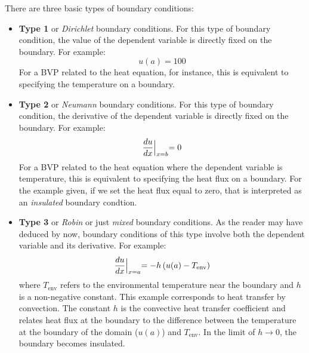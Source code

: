 There are three basic types of boundary conditions:
\begin{itemize}
\item \textbf{Type 1} or \emph{Dirichlet} boundary conditions.  For this type of boundary condition, the value of the dependent variable is directly fixed on the boundary.  For example:
\begin{equation*}
u(a) = 100
\end{equation*}
For a BVP related to the heat equation, for instance, this is equivalent to specifying the temperature on a boundary.
\item \textbf{Type 2} or \emph{Neumann} boundary conditions.  For this type of boundary condition, the derivative of the dependent variable is directly fixed on the boundary.  For example:
\begin{equation*}
\frac{du}{dx}\Bigl|_{x=b} = 0
\end{equation*}
For a BVP related to the heat equation where the dependent variable is temperature, this is equivalent to specifying the heat flux on a boundary.  For the example given, if we set the heat flux equal to zero, that is interpreted as an \emph{insulated} boundary condtion.

\item \textbf{Type 3} or \emph{Robin} or just \emph{mixed} boundary conditions. As the reader may have deduced by now, boundary conditions of this type involve both the dependent variable and its derivative.  For example:
\begin{equation*}
\frac{du}{dx}\Bigl|_{x=a} = -h\left(u(a) - T_{\text{env}}\right)
\end{equation*} 
where $T_{\text{env}}$ refers to the environmental temperature near the boundary and $h$ is a non-negative constant. This example corresponds to heat transfer by convection.  The constant $h$ is the convective heat transfer coefficient and relates heat flux at the boundary to the difference between the temperature at the boundary of the domain ($u(a)$) and $T_{\text{env}}$.  In the limit of $h\to 0$, the boundary becomes insulated.

\end{itemize}

